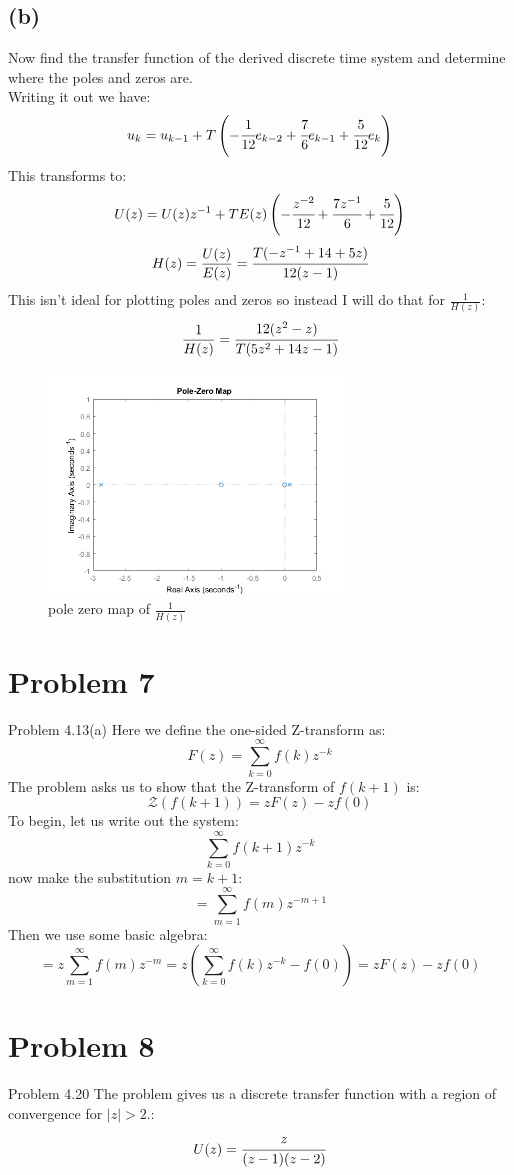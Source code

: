 \documentclass{article}
\begin{document}
\subsection*{(b)}
Now find the transfer function of the derived discrete time system and determine where the poles and zeros are.\\
Writing it out we have:
\[u_k=u_{k-1}+T\left (-\cfrac{1}{12}e_{k-2}+\cfrac{7}{6}e_{k-1}+\cfrac{5}{12}e_k\right )\]
This transforms to:
\[U(z)=U(z)z^{-1}+TE(z)\left (-\cfrac{z^{-2}}{12}+\cfrac{7z^{-1}}{6}+\cfrac{5}{12}\right )\]
\[H(z)=\frac{U(z)}{E(z)}=\cfrac{T(-z^{-1}+14+5z)}{12(z-1)}\]
This isn't ideal for plotting poles and zeros so instead I will do that for $\frac{1}{H(z)}$:
\[\frac{1}{H(z)}=\cfrac{12 (z^2-z)}{T(5z^2+14z-1)}\]
\begin{figure}[H]
    \centering
    \includegraphics[width=0.7\textwidth]{HW1_6b.png}
    \caption{pole zero map of $\frac{1}{H(z)}$}
\end{figure}

\section*{Problem 7}
Problem 4.13(a) Here we define the one-sided Z-transform as:
\[F(z)=\sum_{k=0}^\infty f(k)z^{-k}\]
The problem asks us to show that the Z-transform of $f(k+1)$ is:
\[\mathcal{Z}(f(k+1))=zF(z)-zf(0)\]
To begin, let us write out the system:
\[\sum_{k=0}^\infty f(k+1)z^{-k}\]
now make the substitution $m=k+1$:
\[=\sum_{m=1}^\infty f(m)z^{-m+1}\]
Then we use some basic algebra:
\[=z\sum_{m=1}^\infty f(m)z^{-m}=z\left (\sum_{k=0}^\infty f(k)z^{-k}-f(0)\right )=zF(z)-zf(0)\]

\section*{Problem 8}
Problem 4.20 The problem gives us a discrete transfer function with a region of convergence for $\lvert z\rvert >2$.:
\[U(z)=\cfrac{z}{(z-1)(z-2)}\]
\end{document}
